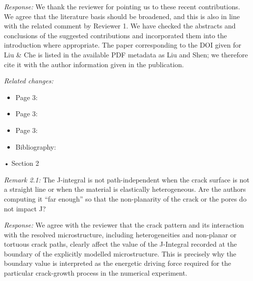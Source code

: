 \documentclass[pdflatex,sn-mathphys-num]{sn-jnl}
\begin{document}
\emph{Response:} We thank the reviewer for pointing us to these recent contributions. We agree that the literature basis should be broadened, and this is also in line with the related comment by Reviewer 1. We have checked the abstracts and conclusions of the suggested contributions and incorporated them into the introduction where appropriate. The paper corresponding to the DOI given for Liu \& Che is listed in the available PDF metadata as Liu and Shen; we therefore cite it with the author information given in the publication.

\emph{Related changes:}
\begin{itemize}
\item Page 3: 
\item Page 3: 
\item Page 3: 
\item Bibliography: 
\end{itemize}

\bigskip

\noindent
• Section 2

\emph{Remark 2.1:} The J-integral is not path-independent when the crack surface is not a straight line or when the material is elastically heterogeneous. Are the authors computing it ``far enough'' so that the non-planarity of the crack or the pores do not impact J?

\emph{Response:} We agree with the reviewer that the crack pattern and its interaction with the resolved microstructure, including heterogeneities and non-planar or tortuous crack paths, clearly affect the value of the J-Integral recorded at the boundary of the explicitly modelled microstructure. This is precisely why the boundary value is interpreted as the energetic driving force required for the particular crack-growth process in the numerical experiment.
\end{document}
